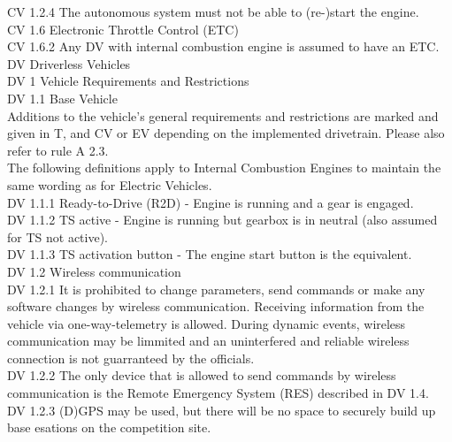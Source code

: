 \documentclass{article}
\begin{document}
CV 1.2.4 The autonomous system must not be able to (re-)start the engine.\\

CV 1.6 Electronic Throttle Control (ETC)\\

CV 1.6.2 Any DV with internal combustion engine is assumed to have an ETC.\\

DV Driverless Vehicles\\

DV 1 Vehicle Requirements and Restrictions\\

DV 1.1 Base Vehicle\\
	Additions to the vehicle's general requirements and restrictions are marked and given in T, and CV or EV depending on the implemented drivetrain. Please also refer to rule A 2.3.\\
	The following definitions apply to Internal Combustion Engines to maintain the same wording as for Electric Vehicles.\\
	
DV 1.1.1 Ready-to-Drive (R2D) - Engine is running and a gear is engaged.\\

DV 1.1.2 TS active - Engine is running but gearbox is in neutral (also assumed for TS not active).\\

DV 1.1.3 TS activation button - The engine start button is the equivalent.\\

DV 1.2 Wireless communication\\

DV 1.2.1 It is prohibited to change parameters, send commands or make any software changes by wireless communication. Receiving information from the vehicle via one-way-telemetry is allowed. During dynamic events, wireless communication may be limmited and an uninterfered and reliable wireless connection is not guarranteed by the officials.\\

DV 1.2.2 The only device that is allowed to send commands by wireless communication is the Remote Emergency System (RES) described in DV 1.4.\\

DV 1.2.3 (D)GPS may be used, but there will be no space to securely build up base esations on the competition site.\\
\end{document}
